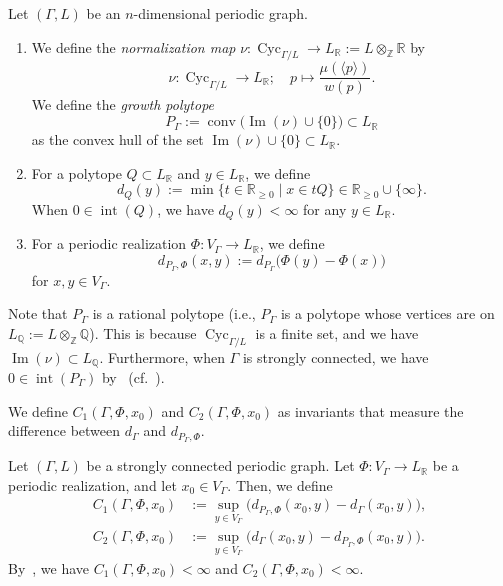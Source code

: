 \begin{defn}\label{defi:P}
Let $(\Gamma , L)$ be an $n$-dimensional periodic graph. 
\begin{enumerate}
\item 
We define the \textit{normalization map} 
$\nu : \operatorname{Cyc}_{\Gamma /L} \to L_{\mathbb{R}} := L \otimes _{\mathbb{Z}} \mathbb{R}$ by 
\[
\nu: \operatorname{Cyc}_{\Gamma /L} \to L_{\mathbb{R}}; \quad p \mapsto \frac{\mu(\langle p \rangle )}{w(p)}. 
\]
We define the \textit{growth polytope}
\[
P_{\Gamma} := \operatorname{conv} \bigl( \operatorname{Im}(\nu) \cup \{ 0 \} \bigr) \subset L_{\mathbb{R}}
\]
as the convex hull of the set 
$\operatorname{Im}(\nu) \cup \{ 0 \} \subset L_{\mathbb{R}}$. 
 
\item 
For a polytope $Q \subset L_{\mathbb{R}}$ and $y \in L_{\mathbb{R}}$, we define 
\[
d_{Q}(y) := \min \{ t \in \mathbb{R}_{\ge 0} \mid x \in t Q \} \in \mathbb{R}_{\ge 0} \cup \{ \infty \}. 
\]
When $0 \in \operatorname{int}(Q)$, 
we have $d_{Q}(y) < \infty$ for any $y \in L_{\mathbb{R}}$. 

\item
For a periodic realization $\Phi:V_{\Gamma} \to L_{\mathbb{R}}$, we define 
\[
d_{P_{\Gamma}, \Phi}(x, y) := d_{P_{\Gamma}}\bigl( \Phi(y) - \Phi(x) \bigr)
\]
for $x, y \in V_{\Gamma}$. 
\end{enumerate}
\end{defn}

\begin{rmk}
Note that $P_{\Gamma}$ is a rational polytope (i.e., $P_{\Gamma}$ is a polytope whose vertices are on $L_{\mathbb{Q}} := L \otimes _{\mathbb{Z}} \mathbb{Q}$). 
This is because $\operatorname{Cyc}_{\Gamma /L}$ is a finite set, and we have $\operatorname{Im}(\nu) \subset L_{\mathbb{Q}}$. 
Furthermore, when $\Gamma$ is strongly connected, we have $0 \in \operatorname{int}(P_{\Gamma})$ by~\cite[Proposition~21]{Fri13} (cf.\ \cite[Lemma A.1]{IN}). 
\end{rmk}

We define $C_{1}(\Gamma, \Phi, x_0)$ and $C_{2}(\Gamma, \Phi, x_0)$ as invariants that measure the difference between $d_{\Gamma}$ and $d_{P_{\Gamma}, \Phi}$. 

\begin{defn}\label{defi:C}
Let $(\Gamma , L)$ be a strongly connected periodic graph. 
Let $\Phi : V_{\Gamma} \to L_{\mathbb{R}}$ be a periodic realization, and let $x_0 \in V_{\Gamma}$. 
Then, we define 
\begin{align*}
C_{1}(\Gamma, \Phi, x_0) &:= \sup _{y \in V_{\Gamma}} \bigl( d_{P_{\Gamma}, \Phi} (x_0, y) - d_{\Gamma} (x_0, y) \bigr), \\
C_{2}(\Gamma, \Phi, x_0) &:= \sup _{y \in V_{\Gamma}} \bigl( d_{\Gamma}(x_0, y) - d_{P_{\Gamma}, \Phi} ( x_0, y ) \bigr). 
\end{align*}
By~\cite[Theorem A.2]{IN}, we have $C_{1}(\Gamma, \Phi, x_0) < \infty$ and $C_{2}(\Gamma, \Phi, x_0) < \infty$. 
\end{defn}

